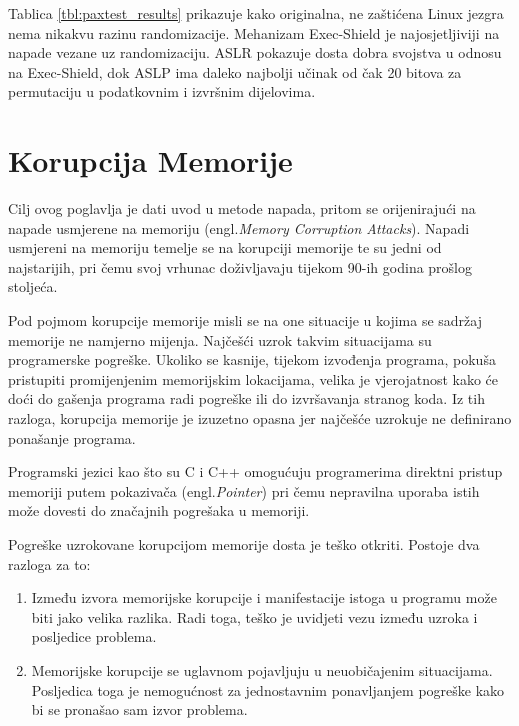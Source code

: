 \documentclass[times, utf8, diplomski, numeric]{fer}
\begin{document}
Tablica \ref{tbl:paxtest_results} prikazuje kako originalna, ne
zaštićena Linux jezgra nema nikakvu razinu randomizacije.
Mehanizam Exec-Shield je najosjetljiviji na napade vezane uz
randomizaciju. ASLR pokazuje dosta dobra svojstva u odnosu na
Exec-Shield, dok ASLP ima daleko najbolji učinak od čak 20 bitova
za permutaciju u podatkovnim i izvršnim dijelovima.

\chapter{Korupcija Memorije}

Cilj ovog poglavlja je dati uvod u metode napada, pritom se
orijenirajući na napade usmjerene na memoriju (engl.\emph{Memory
Corruption Attacks}).  Napadi usmjereni na memoriju temelje se na
korupciji memorije te su jedni od najstarijih, pri čemu svoj
vrhunac doživljavaju tijekom 90-ih godina prošlog stoljeća. 

Pod pojmom korupcije memorije misli se na one situacije u kojima
se sadržaj memorije ne namjerno mijenja. Najčešći uzrok takvim
situacijama su programerske pogreške. Ukoliko se kasnije, tijekom
izvođenja programa, pokuša pristupiti promijenjenim memorijskim
lokacijama, velika je vjerojatnost kako će doći do gašenja
programa radi pogreške ili do izvršavanja stranog koda. Iz tih
razloga, korupcija memorije je izuzetno opasna jer najčešće
uzrokuje ne definirano ponašanje programa. 

Programski jezici kao što su C i C++ omogućuju programerima
direktni pristup memoriji putem pokazivača (engl.\emph{Pointer})
pri čemu nepravilna uporaba istih može dovesti do značajnih
pogrešaka u memoriji. 

Pogreške uzrokovane korupcijom memorije dosta je teško otkriti.
Postoje dva razloga za to:

\begin{enumerate}

\item Između izvora memorijske korupcije i manifestacije istoga u
programu može biti jako velika razlika. Radi toga, teško je
uvidjeti vezu između uzroka i posljedice problema.

\item Memorijske korupcije se uglavnom pojavljuju u neuobičajenim
situacijama. Posljedica toga je nemogućnost za jednostavnim
ponavljanjem pogreške kako bi se pronašao sam izvor problema.

\end{enumerate}
\end{document}
